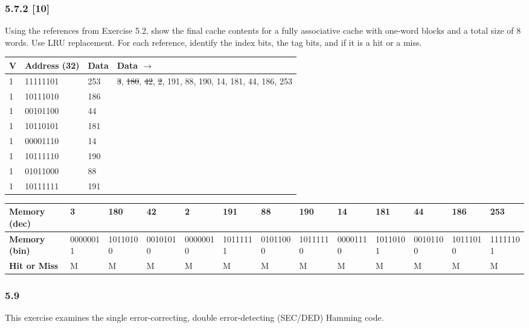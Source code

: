 \documentclass[fleqn]{article}
\begin{document}
\subsubsection*{5.7.2 [10] \textrangle} Using the references from Exercise 5.2, show the final cache contents for a fully associative cache with one-word blocks and a total size of 8 words. Use LRU replacement. For each reference, identify the index bits, the tag bits, and if it is a hit or a miss.
\begin{table}[H]
    \setlength{\tabcolsep}{3pt}
    \fontsize{6pt}{12pt}\selectfont
    \begin{tabular}{l|l|l||l}
    \textbf{V} & \textbf{Address (32)} & \textbf{Data} & \textbf{Data $\rightarrow$} \\ \hline
    1 & 11111101 & 253 &  \st{3}, \st{180}, \st{42}, \st{2}, 191, 88, 190, 14, 181, 44, 186, 253 \\
    1 & 10111010 & 186 & \\
    1 & 00101100 & 44 & \\
    1 & 10110101 & 181 &  \\
    1 & 00001110 & 14 & \\
    1 & 10111110 & 190 & \\
    1 & 01011000 & 88 & \\
    1 & 10111111 & 191 & 
    \end{tabular}
\end{table}

\begin{table}[H]
    \setlength{\tabcolsep}{3pt}
    \fontsize{6pt}{12pt}\selectfont
    \begin{tabular}{l|l|l|l|l|l|l|l|l|l|l|l|l}
    \textbf{Memory (dec)} & \textbf{3} & \textbf{180} & \textbf{42} & \textbf{2} & \textbf{191} & \textbf{88} & \textbf{190} & \textbf{14} & \textbf{181} & \textbf{44} & \textbf{186} & \textbf{253} \\ \hline
    \textbf{Memory (bin)} & 00000011 & 10110100 & 00101010 & 00000010 & 10111111 & 01011000 & 10111110 & 00001110 & 10110101 & 00101100 & 10111010 & 11111101 \\
    \textbf{Hit or Miss} & M & M & M & M & M & M & M & M & M & M & M & M \\
    \end{tabular}
\end{table}

\subsubsection*{5.9} This exercise examines the single error-correcting, double error-detecting (SEC/DED) Hamming code.
\end{document}
